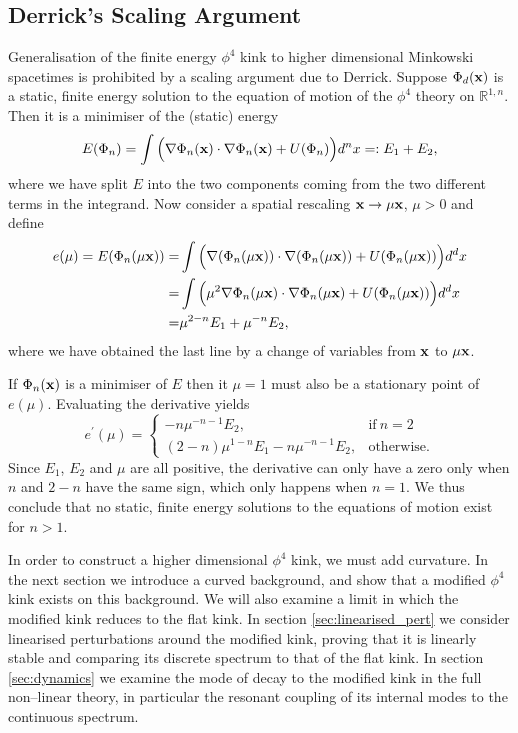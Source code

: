 \subsection{Derrick's Scaling Argument}
Generalisation of the finite energy $\phi^4$ kink to higher dimensional Minkowski spacetimes is prohibited by a scaling argument due to Derrick. Suppose $\Phi_d({\bf x})$ is a static, finite energy solution to the equation of motion of the $\phi^4$ theory on $\mathbb{R}^{1,n}$. Then it is a minimiser of the (static) energy
\[
E(\Phi_n)=\int\Big(\nabla\Phi_n({\bf x})\cdot\nabla\Phi_n({\bf x}) + U(\Phi_n)\Big)d^nx=:E_1+E_2,
\]
where we have split $E$ into the two components coming from the two different terms in the integrand. Now consider a spatial rescaling ${\bf x}\rightarrow\mu{\bf x}$, $\mu>0$ and define 
\begin{align*}
e(\mu)= E(\Phi_n(\mu{\bf x}))=&\int\Big(\nabla(\Phi_n(\mu {\bf x}))\cdot\nabla(\Phi_n(\mu {\bf x})) + U(\Phi_n(\mu {\bf x}))\Big)d^dx \\
=& \int\Big(\mu^2\nabla\Phi_n(\mu {\bf x})\cdot\nabla\Phi_n(\mu {\bf x}) + U(\Phi_n(\mu {\bf x}))\Big)d^dx \\
=& \mu^{2-n}E_1 + \mu^{-n}E_2,
\end{align*}
where we have obtained the last line by a change of variables from ${\bf x}$ to $\mu{\bf x}$.

If $\Phi_n({\bf x})$ is a minimiser of $E$ then it $\mu=1$ must also be a stationary point of $e(\mu)$. Evaluating the derivative yields
\[
e^\prime(\mu)= \begin{cases}
      -n\mu^{-n-1}E_2, & \text{if}\ n=2 \\
      (2-n)\mu^{1-n}E_1 -n\mu^{-n-1}E_2, & \text{otherwise}.
    \end{cases}
\]
Since $E_1$, $E_2$ and $\mu$ are all positive, the derivative can only have a zero only when $n$ and $2-n$ have the same sign, which only happens when $n=1$. We thus conclude that no static, finite energy solutions to the equations of motion exist for $n>1$.

In order to construct a higher dimensional $\phi^4$ kink, we must add curvature. In the next section we introduce a curved background, and show that a modified $\phi^4$ kink exists on this background. We will also examine a limit in which the modified kink reduces to the flat kink. In section \ref{sec:linearised_pert} we consider linearised perturbations around the modified kink, proving that it is linearly stable and comparing its discrete spectrum to that of the flat kink. In section \ref{sec:dynamics} we examine the mode of decay to the modified kink in the full non--linear theory, in particular the resonant coupling of its internal modes to the continuous spectrum.

